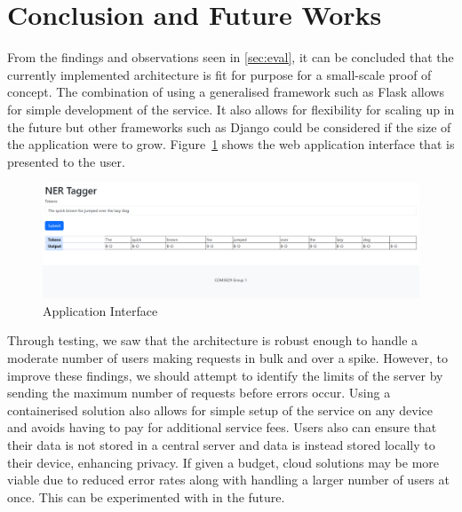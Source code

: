 \documentclass{surreydissertation}
\begin{document}
\section{Conclusion and Future Works}
From the findings and observations seen
in \autoref{sec:eval}, it can be concluded that the currently implemented architecture is fit for purpose for a small-scale proof of concept. The combination of using a generalised framework such as Flask allows for simple development of the service. It also allows for flexibility for scaling up in the future but other frameworks such as Django could be considered if the size of the application were to grow. Figure~\ref{fig:interface} shows the web application interface that is presented to the user.

\begin{figure}
    \centering
    \includegraphics[width=1.0\linewidth]{Figures/frontend.png}
    \caption{Application Interface}
    \label{fig:interface}
 \end{figure}

Through testing, we saw that the architecture is robust enough to handle a moderate number of users making requests in bulk and over a spike. However, to improve these findings, we should attempt to identify the limits of the server by sending the maximum number of requests before errors occur. Using a containerised solution also allows for simple setup of the service on any device and avoids having to pay for additional service fees. Users also can ensure that their data is not stored in a central server and data is instead stored locally to their device, enhancing privacy. If given a budget, cloud solutions may be more viable due to reduced error rates along with handling a larger number of users at once. This can be experimented with in the future.

\appendix
%
%



\end{document}
